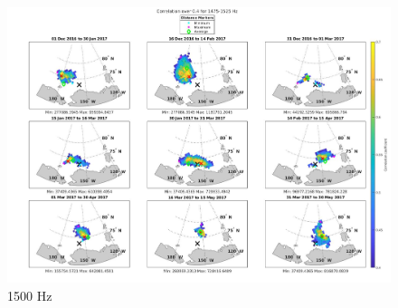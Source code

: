 \begin{figure}[p]
\centering
\includegraphics[scale=0.29]{Figures/megamap_noisland_0.4_1500.jpg}
\caption{1500 Hz}
\end{figure}


